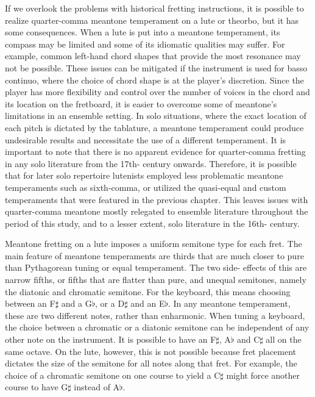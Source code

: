If we overlook the problems with historical fretting instructions, it is possible to realize
quarter-comma meantone temperament on a lute or theorbo, but it has some consequences.  When a lute
is put into a meantone temperament, its compass may be limited and some of its idiomatic qualities
may suffer.  For example, common left-hand chord shapes that provide the most resonance may not be
possible.  These issues can be mitigated if the instrument is used for basso continuo, where the
choice of chord shape is at the player's discretion.  Since the player has more flexibility and
control over the number of voices in the chord and its location on the fretboard, it is easier to
overcome some of meantone's limitations in an ensemble setting.  In solo situations, where the exact
location of each pitch is dictated by the tablature, a meantone temperament could produce
undesirable results and necessitate the use of a different temperament.  It is important to note
that there is no apparent evidence for quarter-comma fretting in any solo literature from the 17th-
century onwards. Therefore, it is possible that for later solo repertoire lutenists employed less
problematic meantone temperaments such as sixth-comma, or utilized the quasi-equal and custom
temperaments that were featured in the previous chapter. This leaves issues with quarter-comma
meantone mostly relegated to ensemble literature throughout the period of this study, and to a
lesser extent, solo literature in the 16th- century.

Meantone fretting on a lute imposes a uniform semitone type for each fret. The main feature of
meantone temperaments are thirds that are much closer to pure than Pythagorean tuning or equal
temperament. The two side- effects of this are narrow fifths, or fifths that are flatter than pure,
and unequal semitones, namely the diatonic and chromatic semitone.  For the keyboard, this means
choosing between an F$\sharp$ and a G$\flat$, or a D$\sharp$ and an E$\flat$.  In any meantone
temperament, these are two different notes, rather than enharmonic.  When tuning a keyboard, the
choice between a chromatic or a diatonic semitone can be independent of any other note on the
instrument. It is possible to have an F$\sharp$, A$\flat$ and C$\sharp$ all on the same octave.  On
the lute, however, this is not possible because fret placement dictates the size of the semitone for
all notes along that fret. For example, the choice of a chromatic semitone on one course to yield a
C$\sharp$ might force another course to have G$\sharp$ instead of A$\flat$.

